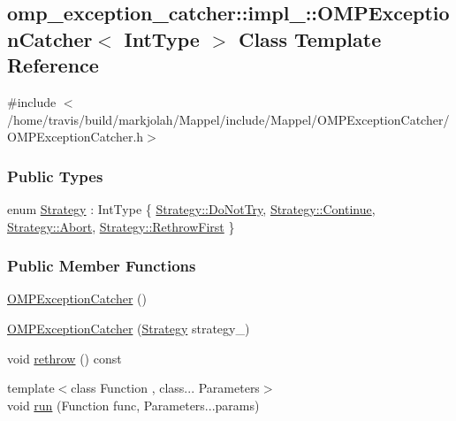 \hypertarget{classomp__exception__catcher_1_1impl___1_1OMPExceptionCatcher}{}\subsection{omp\+\_\+exception\+\_\+catcher\+:\+:impl\+\_\+\+:\+:O\+M\+P\+Exception\+Catcher$<$ Int\+Type $>$ Class Template Reference}
\label{classomp__exception__catcher_1_1impl___1_1OMPExceptionCatcher}


{\ttfamily \#include $<$/home/travis/build/markjolah/\+Mappel/include/\+Mappel/\+O\+M\+P\+Exception\+Catcher/\+O\+M\+P\+Exception\+Catcher.\+h$>$}

\subsubsection*{Public Types}
\begin{DoxyCompactItemize}
\item 
enum \hyperlink{classomp__exception__catcher_1_1impl___1_1OMPExceptionCatcher_ab73d40c948b8be83af2f416075e47a45}{Strategy} \+: Int\+Type \{ \hyperlink{classomp__exception__catcher_1_1impl___1_1OMPExceptionCatcher_ab73d40c948b8be83af2f416075e47a45a7b2e9a6112ae937175819b661a4c0c67}{Strategy\+::\+Do\+Not\+Try}, 
\hyperlink{classomp__exception__catcher_1_1impl___1_1OMPExceptionCatcher_ab73d40c948b8be83af2f416075e47a45aa0bfb8e59e6c13fc8d990781f77694fe}{Strategy\+::\+Continue}, 
\hyperlink{classomp__exception__catcher_1_1impl___1_1OMPExceptionCatcher_ab73d40c948b8be83af2f416075e47a45a727b63583e01fa2b3952dab580c84dc2}{Strategy\+::\+Abort}, 
\hyperlink{classomp__exception__catcher_1_1impl___1_1OMPExceptionCatcher_ab73d40c948b8be83af2f416075e47a45a10308abc2313a8ec42d67a45a0122860}{Strategy\+::\+Rethrow\+First}
 \}
\end{DoxyCompactItemize}
\subsubsection*{Public Member Functions}
\begin{DoxyCompactItemize}
\item 
\hyperlink{classomp__exception__catcher_1_1impl___1_1OMPExceptionCatcher_aca07d00c9c213ad3465e47ecaf507d3e}{O\+M\+P\+Exception\+Catcher} ()
\item 
\hyperlink{classomp__exception__catcher_1_1impl___1_1OMPExceptionCatcher_a6b536d66aa2890adb27c045763c84931}{O\+M\+P\+Exception\+Catcher} (\hyperlink{classomp__exception__catcher_1_1impl___1_1OMPExceptionCatcher_ab73d40c948b8be83af2f416075e47a45}{Strategy} strategy\+\_\+)
\item 
void \hyperlink{classomp__exception__catcher_1_1impl___1_1OMPExceptionCatcher_a8e3f8cc8faaec344e72d24b06c276193}{rethrow} () const 
\item 
{\footnotesize template$<$class Function , class... Parameters$>$ }\\void \hyperlink{classomp__exception__catcher_1_1impl___1_1OMPExceptionCatcher_a60d3dfaeea152046b3d7c93a302d33e6}{run} (Function func, Parameters...\+params)
\end{DoxyCompactItemize}
